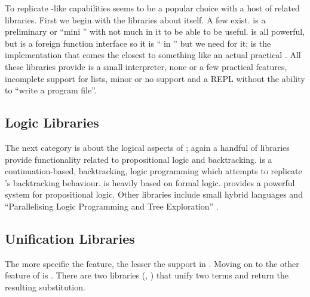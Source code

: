 \documentclass[thesis-solanki.tex]{subfiles}
\begin{document}
To replicate -like
capabilities  seems to be a popular choice
with a host of related libraries.
First we begin with the libraries about  itself.
A few exist. \cite{nanoprolog-lib} is a preliminary or
``mini '' with not much in it to be able to be useful. \cite{hswip-lib}
is all powerful, but is a foreign function interface so it is `` in '' but we
need  for it;
\cite{prolog-lib}
is the implementation that comes the closest
to something like an actual practical .
All these libraries provide is a small interpreter, none or a few practical features, incomplete support for lists, minor or
no  support and a REPL without the ability to ``write a  program
file''.

\subsection{Logic Libraries}

The next category is about the logical aspects of ; again a handful of libraries provide
functionality related to propositional logic and backtracking.
\cite{logict-lib} is a continuation-based, backtracking, logic programming  which attempts
to replicate
's backtracking behaviour.
 is heavily based on formal logic.
\cite{proplogic-lib} provides a powerful system for propositional logic.
Other libraries include small hybrid languages \cite{cflp-lib} and ``Parallelising Logic Programming and Tree
Exploration'' \cite{logic-grows-on-trees-lib}.


\subsection{Unification Libraries}

The more specific the feature, the lesser the support in .
Moving on to the other feature of  is .
There are two libraries (\cite{unification-fd-lib}, \cite{cmu-lib}) that unify two  terms and return
the resulting substitution.
\end{document}
